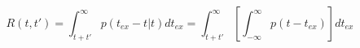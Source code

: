 \begin{equation}
R(t,t') = \int_{t+t'}^\infty p(t_{ex}-t|t) dt_{ex}  = \int_{t+t'}^\infty \left[ \int_{-\infty}^\infty p(t-t_{ex})\right]  dt_{ex}
\end{equation}
